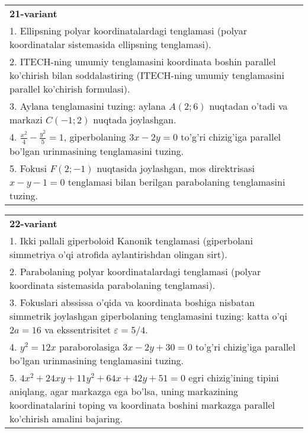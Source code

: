 \documentclass{article}
\begin{document}
\begin{tabular}{m{17cm}}
\textbf{21-variant}\\
1. Ellipsning polyar koordinatalardagi tenglamasi (polyar koordinatalar sistemasida ellipsning tenglamasi).\\

2. ITECH-ning umumiy tenglamasini koordinata boshin parallel ko'chirish bilan soddalastiring (ITECH-ning umumiy tenglamasini parallel ko'chirish formulasi).\\

3. Aylana tenglamasini tuzing: aylana $A(2;6)$ nuqtadan o'tadi va markazi $C(-1;2)$ nuqtada joylashgan.\\

4. $\frac{x^{2}}{4} - \frac{y^{2}}{5} = 1$, giperbolaning $3x - 2y = 0$ to'g'ri chizig'iga parallel bo'lgan urinmasining tenglamasini tuzing.  \\

5. Fokusi $F(2; - 1)$ nuqtasida joylashgan, mos direktrisasi $x - y - 1 = 0$ tenglamasi bilan berilgan parabolaning tenglamasini tuzing.  
\end{tabular}
\vspace{1cm}


\begin{tabular}{m{17cm}}
\textbf{22-variant}\\
1. Ikki pallali giperboloid Kanonik tenglamasi (giperbolani simmetriya o'qi atrofida aylantirishdan olingan sirt).\\

2. Parabolaning polyar koordinatalardagi tenglamasi (polyar koordinata sistemasida parabolaning tenglamasi).\\

3. Fokuslari abssissa o'qida va koordinata boshiga nisbatan simmetrik joylashgan giperbolaning tenglamasini tuzing: katta o'qi $2a=16$ va ekssentrisitet $\varepsilon=5/4$.\\

4. $y^{2} = 12x$ paraborolasiga $3x - 2y + 30 = 0$ to'g'ri chizig'iga parallel bo'lgan urinmasining tenglamasini tuzing.  \\

5. $4x^{2} + 24xy + 11y^{2} + 64x + 42y + 51 = 0$ egri chizig'ining tipini aniqlang, agar markazga ega bo'lsa, uning markazining koordinatalarini toping va koordinata boshini markazga parallel ko'chirish amalini bajaring.
\end{tabular}
\vspace{1cm}
\end{document}
